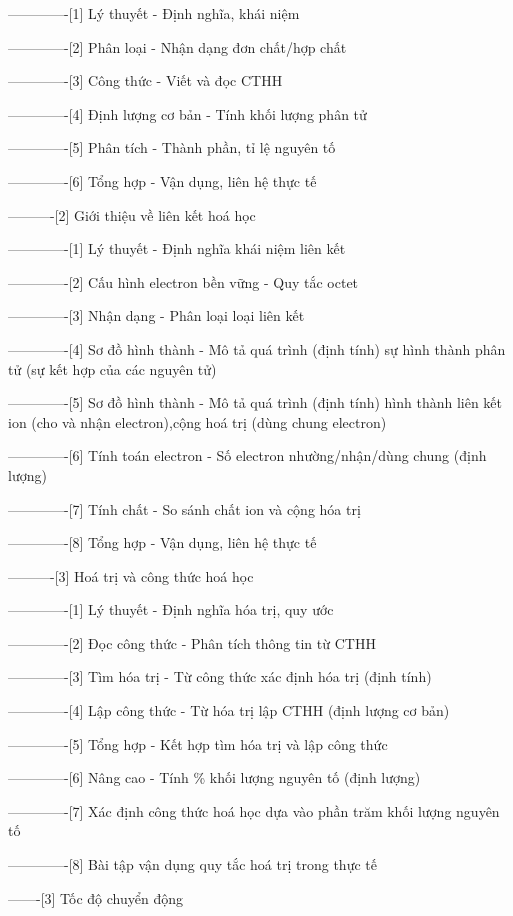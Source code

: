 -------------[1] Lý thuyết - Định nghĩa, khái niệm

-------------[2] Phân loại - Nhận dạng đơn chất/hợp chất

-------------[3] Công thức - Viết và đọc CTHH

-------------[4] Định lượng cơ bản - Tính khối lượng phân tử

-------------[5] Phân tích - Thành phần, tỉ lệ nguyên tố

-------------[6] Tổng hợp - Vận dụng, liên hệ thực tế

----------[2] Giới thiệu về liên kết hoá học

-------------[1] Lý thuyết - Định nghĩa khái niệm liên kết

-------------[2] Cấu hình electron bền vững - Quy tắc octet

-------------[3] Nhận dạng - Phân loại loại liên kết

-------------[4] Sơ đồ hình thành - Mô tả quá trình (định tính) sự hình thành phân tử (sự kết hợp của các nguyên tử)

-------------[5] Sơ đồ hình thành - Mô tả quá trình (định tính) hình thành liên kết ion (cho và nhận electron),cộng hoá trị (dùng chung electron) 

-------------[6] Tính toán electron - Số electron nhường/nhận/dùng chung (định lượng)

-------------[7] Tính chất - So sánh chất ion và cộng hóa trị

-------------[8] Tổng hợp - Vận dụng, liên hệ thực tế

----------[3] Hoá trị và công thức hoá học

-------------[1] Lý thuyết - Định nghĩa hóa trị, quy ước

-------------[2] Đọc công thức - Phân tích thông tin từ CTHH

-------------[3] Tìm hóa trị - Từ công thức xác định hóa trị (định tính)

-------------[4] Lập công thức - Từ hóa trị lập CTHH (định lượng cơ bản)

-------------[5] Tổng hợp - Kết hợp tìm hóa trị và lập công thức

-------------[6] Nâng cao - Tính \% khối lượng nguyên tố (định lượng)

-------------[7] Xác định công thức hoá học dựa vào phần trăm khối lượng nguyên tố

-------------[8] Bài tập vận dụng quy tắc hoá trị trong thực tế

-------[3] Tốc độ chuyển động

